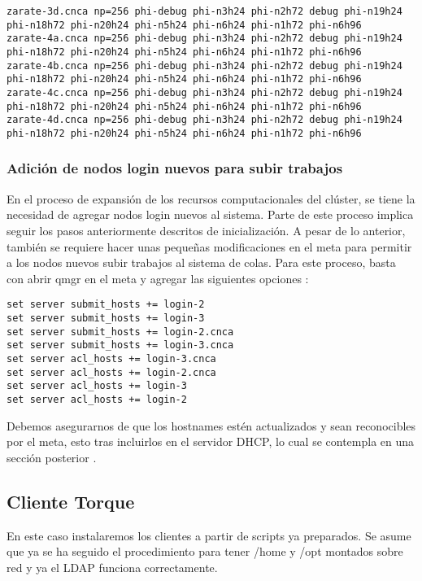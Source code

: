 \begin{lstlisting}
zarate-3d.cnca np=256 phi-debug phi-n3h24 phi-n2h72 debug phi-n19h24 phi-n18h72 phi-n20h24 phi-n5h24 phi-n6h24 phi-n1h72 phi-n6h96
zarate-4a.cnca np=256 phi-debug phi-n3h24 phi-n2h72 debug phi-n19h24 phi-n18h72 phi-n20h24 phi-n5h24 phi-n6h24 phi-n1h72 phi-n6h96
zarate-4b.cnca np=256 phi-debug phi-n3h24 phi-n2h72 debug phi-n19h24 phi-n18h72 phi-n20h24 phi-n5h24 phi-n6h24 phi-n1h72 phi-n6h96
zarate-4c.cnca np=256 phi-debug phi-n3h24 phi-n2h72 debug phi-n19h24 phi-n18h72 phi-n20h24 phi-n5h24 phi-n6h24 phi-n1h72 phi-n6h96
zarate-4d.cnca np=256 phi-debug phi-n3h24 phi-n2h72 debug phi-n19h24 phi-n18h72 phi-n20h24 phi-n5h24 phi-n6h24 phi-n1h72 phi-n6h96

\end{lstlisting}

\subsubsection{Adición de nodos login nuevos para subir trabajos}
En el proceso de expansión de los recursos computacionales del clúster, se tiene la necesidad de agregar nodos login nuevos al sistema. Parte de este proceso implica seguir los pasos anteriormente descritos de inicialización. A pesar de lo anterior, también se requiere hacer unas pequeñas modificaciones en el meta para permitir a los nodos nuevos subir trabajos al sistema de colas. Para este proceso, basta con abrir qmgr en el meta y agregar las siguientes opciones \cite{add_host_torque}:

\begin{lstlisting}
set server submit_hosts += login-2
set server submit_hosts += login-3
set server submit_hosts += login-2.cnca
set server submit_hosts += login-3.cnca
set server acl_hosts += login-3.cnca
set server acl_hosts += login-2.cnca
set server acl_hosts += login-3
set server acl_hosts += login-2
\end{lstlisting}

Debemos asegurarnos de que los hostnames estén actualizados y sean reconocibles por el meta, esto tras incluirlos en el servidor DHCP, lo cual se contempla en una sección posterior \cite{bad_uid_torque}.

\subsection{Cliente Torque}
En este caso instalaremos los clientes a partir de scripts ya preparados. Se asume que ya se ha seguido el procedimiento para tener /home y /opt montados sobre red y ya el LDAP funciona correctamente.



